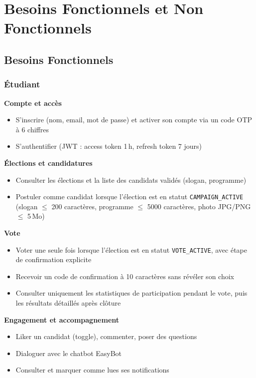 \documentclass[12pt,a4paper]{report}
\begin{document}
\chapter{Besoins Fonctionnels et Non Fonctionnels}\label{ch:besoins}

\section{Besoins Fonctionnels}

\subsection{Étudiant}
\textbf{Compte et accès}
\begin{itemize}
  \item S'inscrire (nom, email, mot de passe) et activer son compte via un code OTP à 6 chiffres
  \item S'authentifier (JWT : access token 1\,h, refresh token 7 jours)
\end{itemize}
\textbf{Élections et candidatures}
\begin{itemize}
  \item Consulter les élections et la liste des candidats validés (slogan, programme)
  \item Postuler comme candidat lorsque l'élection est en statut \texttt{CAMPAIGN\_ACTIVE} (slogan $\leq$ 200 caractères, programme $\leq$ 5000 caractères, photo JPG/PNG $\leq$ 5\,Mo)
\end{itemize}
\textbf{Vote}
\begin{itemize}
  \item Voter une seule fois lorsque l'élection est en statut \texttt{VOTE\_ACTIVE}, avec étape de confirmation explicite
  \item Recevoir un code de confirmation à 10 caractères sans révéler son choix
  \item Consulter uniquement les statistiques de participation pendant le vote, puis les résultats détaillés après clôture
\end{itemize}
\textbf{Engagement et accompagnement}
\begin{itemize}
  \item Liker un candidat (toggle), commenter, poser des questions
  \item Dialoguer avec le chatbot EasyBot
  \item Consulter et marquer comme lues ses notifications
\end{itemize}
\end{document}
